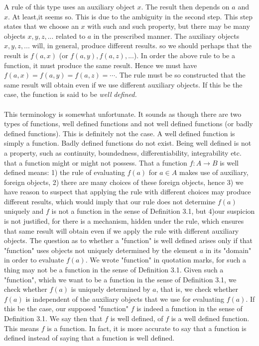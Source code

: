 \documentclass[a4paper,11pt]{amsbook}
\begin{document}
\noindent
A rule of this type uses an auxiliary object $x$. The result then depends on
$a$ and $x$. At least,it seems so. This is due to the ambiguity in the second
step. This step states that we choose an $x$ with such and such property,
but there may be many objects $x,y,z,$... related to $a$ in the prescribed
manner. The auxiliary objects $x,y,z,$... will, in general, produce different
results. so we should perhaps that the result is $f(a,x)$ (or $f(a,y),f(a,z),$...).
In order the above rule to be a function, it must produce the same
result. Hence we must have $f(a,x)=f(a,y)=f(a,z)=\cdots$. The rule must be
so constructed that the same result will obtain even if we use different
auxiliary objects. If this be the case, the function is said to be \textit{well }
\textit{defined.}
\\
\\This terminology is somewhat unfortunate. It sounds as though there
are two types of functions, well defined functions and not well defined
functions (or badly defined functions). This is definitely not the case. A
well defined function is simply a function. Badly defined functions do
not exist. Being well defined is not a property, such as continuity,
boundedness, differentiability, integrability etc. that a function might or
might not possess. That a function $f:A\rightarrow B$ is well defined means: 1) the
rule of evaluating $f(a)$ for $a\in A$ makes use of auxiliary, foreign objects,
2) there are many choices of these foreign objects, hence 3) we have
reason to suspect that applying the rule with different choices may
produce different results, which would imply that our rule does not
determine $f(a)$ uniquely and $f$ is not a function in the sense of Definition
3.1, but 4)our suspicion is not justified, for there is a mechanism, hidden
under the rule, which ensures that same result will obtain even if we
apply the rule with different auxiliary objects. The question as to
whether a "function" is well defined arises only if that "function" uses
objects not uniquely determined by the element $a$ in its "domain" in
order to evaluate $f(a)$. We wrote "function" in quotation marks, for such
a thing may not be a function in the sense of Definition 3.1. Given such a
"function", which we want to be a function in the sense of Definition 3.1,
we check whether $f(a)$ is uniquely determined by $a$, that is, we check
whether $f(a)$ is independent of the auxiliary objects that we use for
evaluating $f(a)$. If this be the case, our supposed "function" $f$ is indeed a
function in the sense of Definition 3.1. We say then that $f$ is well defined,
of $f$ is a well defined function. This means $f$ is a function. In fact, it is
more accurate to say that a function is defined instead of saying that a
function is well defined.
\end{document}
